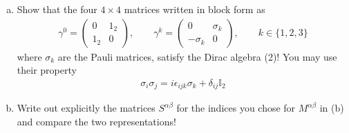 \documentclass[../main.tex]{subfiles}
\begin{document}
{\begin{enumerate}[(a)]
\begin{align}
\end{align}
where the anticommutator is defined by $\{A,B\}=AB+BA$. Show that the matrices
\begin{align}
S^{\alpha\beta}=\frac{i}{4}[\gamma^\alpha,\gamma^\beta]
\end{align}
satisfy (\ref{Klose41a}) with $M$ replaced by $S$! If you want to use
\begin{align}
[A,BC]&=[A,B]C+B[A,C]=\{A,B\}C-B\{A,C\}\\
[AB,C]&=A[B,C]+[A,C]B=A\{B,C\}-\{A,C\}B\\
\end{align}
then you have to show that these identities are indeed true.
\item Show that the four $4\times4$ matrices written in block form as
\begin{align}
\gamma^0=\left(\begin{matrix}
0 & 1_2\\
1_2 & 0
\end{matrix}\right),\qquad
\gamma^k=\left(\begin{matrix}
0 & \sigma_k\\
-\sigma_k & 0
\end{matrix}\right),\qquad k\in\{1,2,3\}
\end{align}
where $\sigma_k$ are the Pauli matrices, satisfy the Dirac algebra (2)! You may use their property
\begin{align}
\sigma_i\sigma_j=i\epsilon_{ijk}\sigma_k+\delta_{ij}\mathbb{I}_2
\end{align}
\item Write out explicitly the matrices $S^{\alpha\beta}$ for the indices you chose for $M^{\alpha\beta}$ in (b) and
compare the two representations!
\end{enumerate}
}
\end{document}
